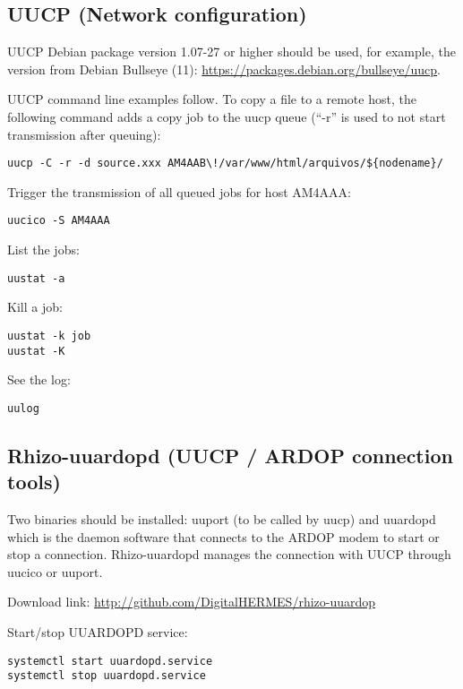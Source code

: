 \documentclass[11pt,a4paper]{article}
\begin{document}
\subsection{UUCP (Network configuration)}

UUCP Debian package version 1.07-27 or higher should be used, for example,
the version from Debian Bullseye (11): \url{https://packages.debian.org/bullseye/uucp}.

UUCP command line examples follow. To copy a file to a remote host,
the following command adds a copy job to the uucp queue (``-r'' is used to
not start transmission after queuing):
\begin{verbatim}
uucp -C -r -d source.xxx AM4AAB\!/var/www/html/arquivos/${nodename}/
\end{verbatim}

Trigger the transmission of all queued jobs for host
AM4AAA:
\begin{verbatim}
uucico -S AM4AAA
\end{verbatim}

List the jobs:
\begin{verbatim}
uustat -a
\end{verbatim}

Kill a job:
\begin{verbatim}
uustat -k job
uustat -K
\end{verbatim}

See the log:
\begin{verbatim}
uulog
\end{verbatim}


\subsection{Rhizo-uuardopd (UUCP / ARDOP connection tools)}


Two binaries should be installed: uuport (to be called by uucp) and uuardopd
which is the daemon software that connects to the ARDOP modem to start
or stop a connection. Rhizo-uuardopd manages the connection with UUCP
through uucico or uuport.

Download link: \url{http://github.com/DigitalHERMES/rhizo-uuardop}

Start/stop UUARDOPD service:
\begin{verbatim}
systemctl start uuardopd.service
systemctl stop uuardopd.service
\end{verbatim}
\end{document}
